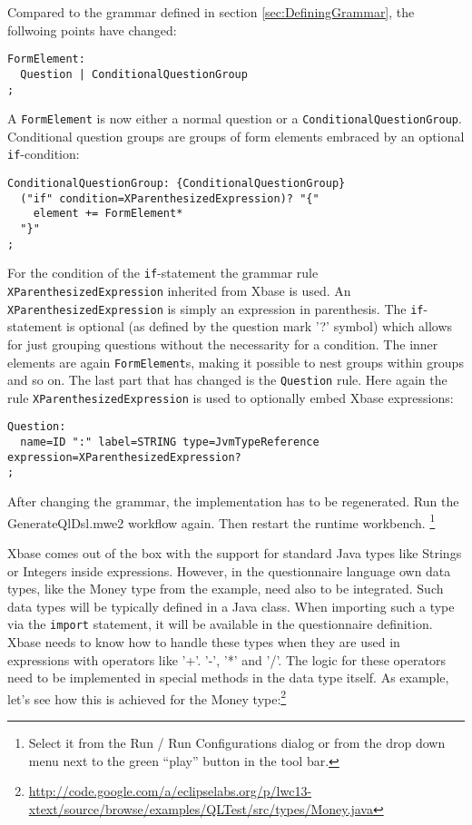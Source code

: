 Compared to the grammar defined in section \ref{sec:DefiningGrammar}, the follwoing points have changed:


\begin{lstlisting}[language=Xtext]
FormElement:
  Question | ConditionalQuestionGroup
;
\end{lstlisting}

A \texttt{FormElement} is now either a normal question or a \texttt{ConditionalQuestionGroup}. Conditional
question groups are groups of form elements embraced by an optional \texttt{if}-condition:

\begin{lstlisting}[language=Xtext]
ConditionalQuestionGroup: {ConditionalQuestionGroup}
  ("if" condition=XParenthesizedExpression)? "{"
    element += FormElement*
  "}"
;
\end{lstlisting}

For the condition of the \texttt{if}-statement the grammar rule \texttt{XParenthesizedExpression} 
inherited from Xbase is used. An \texttt{XParenthesizedExpression} is simply an expression in parenthesis.
The \texttt{if}-statement is optional (as defined by the question mark '?' symbol) which allows for just
grouping questions without the necessarity for a condition. The inner elements are again \texttt{FormElement}s,
making it possible to nest groups within groups and so on. The last part that has changed is the \texttt{Question}
rule. Here again the rule \texttt{XParenthesizedExpression} is used to optionally embed Xbase expressions:

\begin{lstlisting}[language=Xtext]
Question:
  name=ID ":" label=STRING type=JvmTypeReference expression=XParenthesizedExpression?
;
\end{lstlisting}

After changing the grammar, the implementation has to be regenerated. Run the
GenerateQlDsl.mwe2 workflow again. Then restart the runtime workbench.
\footnote{Select it from the Run / Run Configurations dialog or from the drop
down menu next to the green ``play'' button in the tool bar.}

Xbase comes out of the box with the support for standard Java types like Strings or Integers inside expressions.
However, in the questionnaire language own data types, like the Money type from the example, need also to be
integrated. Such data types will be typically defined in a Java class. When importing such a type via the \texttt{import}
statement, it will be available in the questionnaire definition. Xbase needs to know how to handle
these types when they are used in expressions with operators like '+'. '-', '*' and '/'. The logic for these
operators need to be implemented in special methods in the data type itself. As example, let's see how this
is achieved for the Money
type:\footnote{\url{http://code.google.com/a/eclipselabs.org/p/lwc13-xtext/source/browse/examples/QLTest/src/types/Money.java}}


